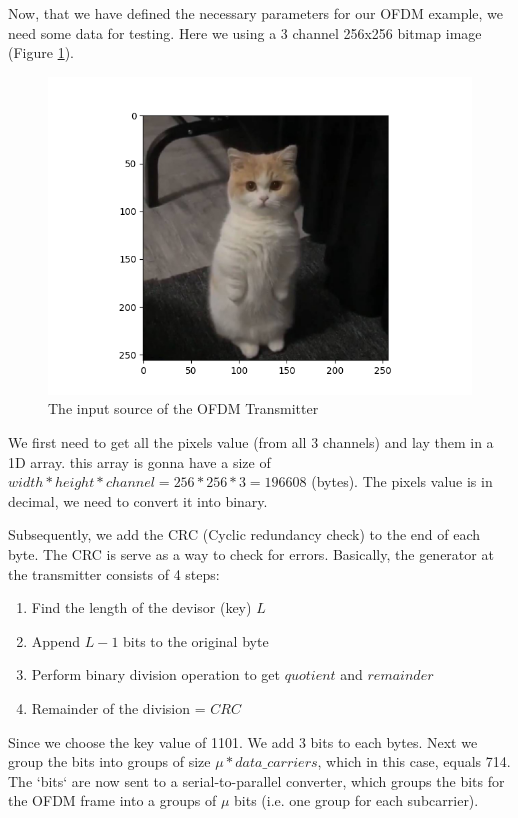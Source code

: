 Now, that we have defined the necessary parameters for our OFDM example, we need some data for testing. Here we using a 3 channel 256x256 bitmap image (Figure \ref{input}).

\begin{figure}[htbp]
    \centering
    \includegraphics[width=\textwidth]{../Source/results/input}
    \caption{The input source of the OFDM Transmitter}
    \label{input}
\end{figure}

We first need to get all the pixels value (from all 3 channels) and lay them in a 1D array. this array is gonna have a size of $width*height*channel = 256*256*3 = 196608$ (bytes). The pixels value is in decimal, we need to convert it into binary.

Subsequently, we add the CRC (Cyclic redundancy check) \cite{crc} to the end of each byte. The CRC is serve as a way to check for errors. Basically, the  generator at the transmitter consists of 4 steps:

\begin{enumerate}
    \item Find the length of the devisor (key) $L$
    \item Append $L-1$ bits to the original byte
    \item Perform binary division operation to get $quotient$ and $remainder$
    \item Remainder of the division = $CRC$
\end{enumerate}

Since we choose the key value of 1101. We add 3 bits to each bytes. Next we group the bits into groups of size $\mu * data\_carriers$, which in this case, equals 714. The `bits` are now sent to a serial-to-parallel converter, which groups the bits for the OFDM frame into a groups of $\mu$ bits (i.e. one group for each subcarrier).

